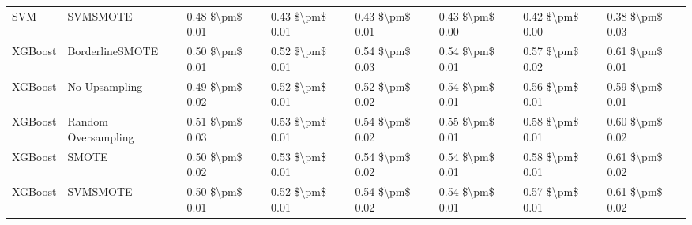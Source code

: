 \begin{tabular}{llllllll}
                            SVM &                      SVMSMOTE &     0.48 \$\textbackslash pm\$ 0.01 &           0.43 \$\textbackslash pm\$ 0.01 &       0.43 \$\textbackslash pm\$ 0.01 &        0.43 \$\textbackslash pm\$ 0.00 &                         0.42 \$\textbackslash pm\$ 0.00 &     0.38 \$\textbackslash pm\$ 0.03 \\
                        XGBoost &               BorderlineSMOTE &     0.50 \$\textbackslash pm\$ 0.01 &           0.52 \$\textbackslash pm\$ 0.01 &       0.54 \$\textbackslash pm\$ 0.03 &        0.54 \$\textbackslash pm\$ 0.01 &                         0.57 \$\textbackslash pm\$ 0.02 &     0.61 \$\textbackslash pm\$ 0.01 \\
                        XGBoost &                 No Upsampling &     0.49 \$\textbackslash pm\$ 0.02 &           0.52 \$\textbackslash pm\$ 0.01 &       0.52 \$\textbackslash pm\$ 0.02 &        0.54 \$\textbackslash pm\$ 0.01 &                         0.56 \$\textbackslash pm\$ 0.01 &     0.59 \$\textbackslash pm\$ 0.01 \\
                        XGBoost &           Random Oversampling &     0.51 \$\textbackslash pm\$ 0.03 &           0.53 \$\textbackslash pm\$ 0.01 &       0.54 \$\textbackslash pm\$ 0.02 &        0.55 \$\textbackslash pm\$ 0.01 &                         0.58 \$\textbackslash pm\$ 0.01 &     0.60 \$\textbackslash pm\$ 0.02 \\
                        XGBoost &                         SMOTE &     0.50 \$\textbackslash pm\$ 0.02 &           0.53 \$\textbackslash pm\$ 0.01 &       0.54 \$\textbackslash pm\$ 0.02 &        0.54 \$\textbackslash pm\$ 0.01 &                         0.58 \$\textbackslash pm\$ 0.01 &     0.61 \$\textbackslash pm\$ 0.02 \\
                        XGBoost &                      SVMSMOTE &     0.50 \$\textbackslash pm\$ 0.01 &           0.52 \$\textbackslash pm\$ 0.01 &       0.54 \$\textbackslash pm\$ 0.02 &        0.54 \$\textbackslash pm\$ 0.01 &                         0.57 \$\textbackslash pm\$ 0.01 &     0.61 \$\textbackslash pm\$ 0.02 \\
\bottomrule
\end{tabular}
